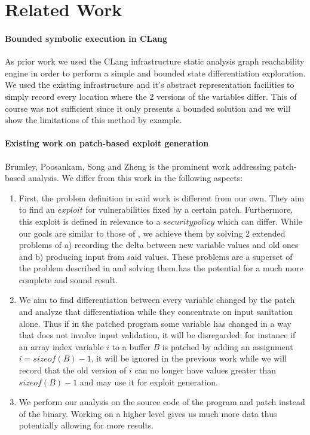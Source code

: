 \section{Related Work}\label{Sec:Related}

\paragraph{Bounded symbolic execution in CLang}
As prior work we used the CLang infrastructure \cite{CLang} static analysis graph reachability engine in order to perform a simple and bounded state differentiation exploration. We used the existing infrastructure and it's abstract representation facilities to simply record every location where the 2 versions of the variables differ. This of course was not sufficient since it only presents a bounded solution and we will show the limitations of this method by example.

\paragraph{Existing work on patch-based exploit generation}
Brumley, Poosankam, Song and Zheng \cite{AutoPatch} is the prominent work addressing patch-based analysis. We differ from this work in the following aspects:
\begin{enumerate}
\item First, the problem definition in said work is different from our own. They aim to find an $exploit$ for vulnerabilities fixed by a certain patch. Furthermore, this exploit is defined in relevance to a $security policy$ which can differ. While our goals are similar to those of \cite{AutoPatch}, we achieve them by solving 2 extended problems of a) recording the delta between new variable values and old ones and b) producing input from said values. These problems are a superset of the problem described in \cite{AutoPatch} and solving them has the potential for a much more complete and sound result.
\item We aim to find differentiation between every variable changed by the patch and analyze that differentiation while they concentrate on input sanitation alone. Thus if in the patched program some variable has changed in a way that does not involve input validation, it will be disregarded: for instance if an array index variable $i$ to a buffer $B$ is patched by adding an assignment $i = sizeof(B) - 1$, it will be ignored in the previous work while we will record that the old version of $i$ can no longer have values greater than $sizeof(B) - 1$ and may use it for exploit generation.
\item We perform our analysis on the source code of the program and patch instead of the binary. Working on a higher level gives us much more data thus potentially allowing for more results.
\end{enumerate}

